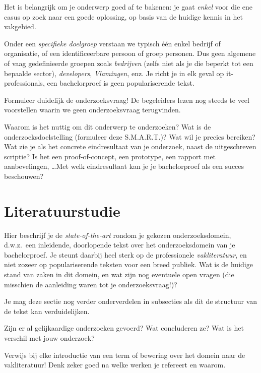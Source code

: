\documentclass{hogent-article}
\begin{document}
Het is belangrijk om je onderwerp goed af te bakenen: je gaat \emph{enkel} voor die ene casus op zoek naar een goede oplossing, op basis van de huidige kennis in het vakgebied.

Onder een \emph{specifieke doelgroep} verstaan we typisch één enkel bedrijf of organisatie, of een identificeerbare persoon of groep personen. Dus geen algemene of vaag gedefinieerde groepen zoals \emph{bedrijven} (zelfs niet als je die beperkt tot een bepaalde sector), \emph{developers}, \emph{Vlamingen}, enz. Je richt je in elk geval op it-professionals, een bachelorproef is geen populariserende tekst.

Formuleer duidelijk de onderzoeksvraag! De begeleiders lezen nog steeds te veel voorstellen waarin we geen onderzoeksvraag terugvinden.

Waarom is het nuttig om dit onderwerp te onderzoeken? Wat is de onderzoeksdoelstelling (formuleer deze S.M.A.R.T.)? Wat wil je precies bereiken? Wat zie je als het concrete eindresultaat van je onderzoek, naast de uitgeschreven scriptie? Is het een proof-of-concept, een prototype, een rapport met aanbevelingen, \ldots Met welk eindresultaat kan je je bachelorproef als een succes beschouwen?

\section{Literatuurstudie}%
\label{sec:literatuurstudie}


Hier beschrijf je de \emph{state-of-the-art} rondom je gekozen onderzoeksdomein, d.w.z.\ een inleidende, doorlopende tekst over het onderzoeksdomein van je bachelorproef. Je steunt daarbij heel sterk op de professionele \emph{vakliteratuur}, en niet zozeer op populariserende teksten voor een breed publiek. Wat is de huidige stand van zaken in dit domein, en wat zijn nog eventuele open vragen (die misschien de aanleiding waren tot je onderzoeksvraag!)? 

Je mag deze sectie nog verder onderverdelen in subsecties als dit de structuur van de tekst kan verduidelijken.

Zijn er al gelijkaardige onderzoeken gevoerd? Wat concluderen ze? Wat is het verschil met jouw onderzoek?

Verwijs bij elke introductie van een term of bewering over het domein naar de vakliteratuur! Denk zeker goed na welke werken je refereert en waarom.
\end{document}

